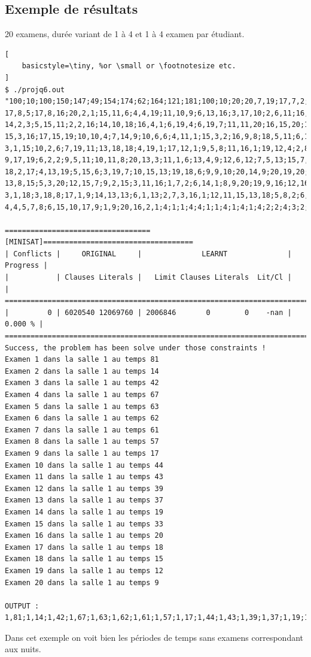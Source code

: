 \documentclass[a4paper,11pt]{article}
\begin{document}
\subsection{Exemple de résultats}
20 examens, durée variant de 1 à 4 et 1 à 4 examen par étudiant.

\begin{lstlisting}[
    basicstyle=\tiny, %or \small or \footnotesize etc.
]
$ ./projq6.out "100;10;100;150;147;49;154;174;62;164;121;181;100;10;20;20,7,19;17,7,2;10,11,15;13,4,19;6,9,11;
17,8,5;17,8,16;20,2,1;15,11,6;4,4,19;11,10,9;6,13,16;3,17,10;2,6,11;16,19,12;5,13,9;20,11,15;7,9,13;
14,2,3;5,15,11;2,2,16;14,10,18;16,4,1;6,19,4;6,19,7;11,11,20;16,15,20;14,20,8;13,20,9;8,6,6;4,17,7;
15,3,16;17,15,19;10,10,4;7,14,9;10,6,6;4,11,1;15,3,2;16,9,8;18,5,11;6,18,20;13,13,3;1,10,1;15,6,19;
3,1,15;10,2,6;7,19,11;13,18,18;4,19,1;17,12,1;9,5,8;11,16,1;19,12,4;2,8,2;6,14,6;10,13,6;11,14,10;
9,17,19;6,2,2;9,5,11;10,11,8;20,13,3;11,1,6;13,4,9;12,6,12;7,5,13;15,7,2;17,18,13;13,8,9;7,16,3;
18,2,17;4,13,19;5,15,6;3,19,7;10,15,13;19,18,6;9,9,10;20,14,9;20,19,20;17,4,1;4,12,18;17,11,15;
13,8,15;5,3,20;12,15,7;9,2,15;3,11,16;1,7,2;6,14,1;8,9,20;19,9,16;12,16,16;5,15,9;20,19,16;4,20,20;
3,1,18;3,18,8;17,1,9;14,13,13;6,1,13;2,7,3,16,1;12,11,15,13,18;5,8,2;6,6,19,20,10;5;14,1,20,5;
4,4,5,7,8;6,15,10,17,9;1,9;20,16,2,1;4;1;1;4;4;1;1;4;1;4;1;4;2;2;4;3;2;3;3;3;"

==================================[MINISAT]===================================
| Conflicts |     ORIGINAL     |              LEARNT              | Progress |
|           | Clauses Literals |   Limit Clauses Literals  Lit/Cl |          |
==============================================================================
|         0 | 6020540 12069760 | 2006846       0        0    -nan |  0.000 % |
==============================================================================
Success, the problem has been solve under those constraints !
Examen 1 dans la salle 1 au temps 81
Examen 2 dans la salle 1 au temps 14
Examen 3 dans la salle 1 au temps 42
Examen 4 dans la salle 1 au temps 67
Examen 5 dans la salle 1 au temps 63
Examen 6 dans la salle 1 au temps 62
Examen 7 dans la salle 1 au temps 61
Examen 8 dans la salle 1 au temps 57
Examen 9 dans la salle 1 au temps 17
Examen 10 dans la salle 1 au temps 44
Examen 11 dans la salle 1 au temps 43
Examen 12 dans la salle 1 au temps 39
Examen 13 dans la salle 1 au temps 37
Examen 14 dans la salle 1 au temps 19
Examen 15 dans la salle 1 au temps 33
Examen 16 dans la salle 1 au temps 20
Examen 17 dans la salle 1 au temps 18
Examen 18 dans la salle 1 au temps 15
Examen 19 dans la salle 1 au temps 12
Examen 20 dans la salle 1 au temps 9
 
OUTPUT : 1,81;1,14;1,42;1,67;1,63;1,62;1,61;1,57;1,17;1,44;1,43;1,39;1,37;1,19;1,33;1,20;1,18;1,15;1,12;1,9;
\end{lstlisting}
Dans cet exemple on voit bien les périodes de temps sans examens correspondant aux nuits.
\end{document}
